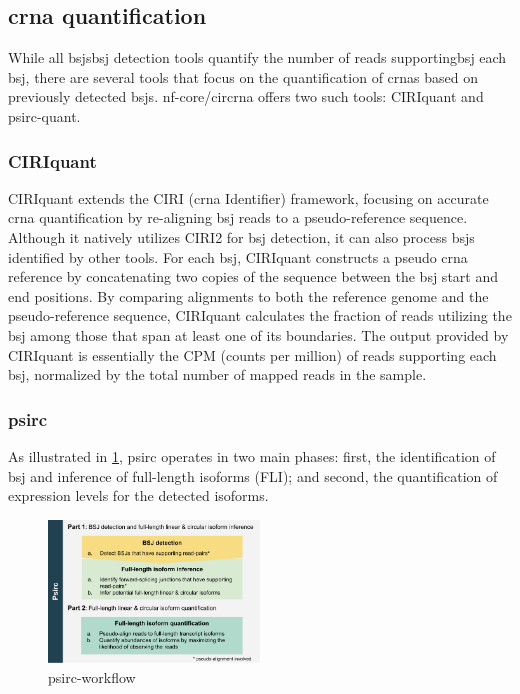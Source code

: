 \subsection{\gls{crna} quantification}

While all \gls{bsj}s{bsj} detection tools quantify the number of reads
supporting\gls{bsj} each \gls{bsj}, there are several tools that focus on the
quantification of \gls{crna}s based on previously detected \gls{bsj}s.
nf-core/circrna offers two such tools: CIRIquant and
psirc-quant.

\subsubsection{CIRIquant}
\label{sec:ciriquant}
CIRIquant extends the CIRI (\Gls{crna} Identifier) framework, focusing on
accurate \gls{crna} quantification by re-aligning \gls{bsj} reads to a
pseudo-reference sequence.
Although it natively utilizes CIRI2 for \gls{bsj} detection, it can also
process \gls{bsj}s identified by other tools\supercite{zhang_accurate_2020}.
For each \gls{bsj}, CIRIquant constructs a pseudo \gls{crna} reference by
concatenating two copies of the sequence between the \gls{bsj} start and end
positions.
By comparing alignments to both the reference genome and the pseudo-reference
sequence, CIRIquant calculates the fraction of reads utilizing the \gls{bsj}
among those that span at least one of its
boundaries\supercite{zhang_accurate_2020}.
The output provided by CIRIquant is essentially the CPM (counts per million) of
reads supporting each \gls{bsj}, normalized by the total number of mapped reads
in the sample.

\subsubsection{psirc}
\label{sec:psirc}
As illustrated in \cref{fig:psirc_workflow}, psirc operates in two main phases:
first, the identification of \gls{bsj} and inference of full-length isoforms
(FLI); and second, the quantification of expression levels for the detected
isoforms\supercite{yu_quantifying_2021}.

\begin{figure}[ht] \centering

    \includegraphics[width=0.5\textwidth]{chapters/3_materials_and_methods/figures/psirc_pipeline.png}
    \caption{psirc-workflow} \label{fig:psirc_workflow} \end{figure}

